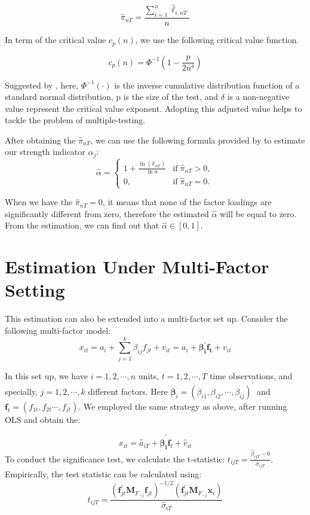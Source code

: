 \[  \hat{\pi}_{nT} = \frac{\sum_{i=1}^n \hat{\ell}_{i,nT}}{n} \tag{4} \label{pi_function} \]


In term of the critical value $c_p(n)$, we use the following critical value function.

\[   c_p(n) = \Phi^{-1}(1 - \frac{p}{2n^\delta})   \tag{5} \label{critical_value_function} \]

Suggested by , here, $\Phi^{-1}(\cdot)$ is the inverse cumulative distribution function of a standard normal distribution, p is the size of the test, and $\delta$ is a non-negative value represent the critical value exponent. 
Adopting this adjusted value helps to tackle the problem of multiple-testing.


After obtaining the $\hat{\pi}_{nT}$, we can use the following formula provided by  to estimate our strength indicator $\alpha_j$:
\[ \hat{\alpha} = \begin{cases}
1+\frac{\ln(\hat{\pi}_{nT})}{\ln n} & \text{if}\; \hat{\pi}_{nT} > 0,\\
0, & \text{if}\; \hat{\pi}_{nT} = 0.
	\end{cases} \tag{6} \label{estimation_method} \]

When we have the $\hat{\pi}_{nT} = 0$, it means that none of the factor loadings are significantly different from zero, therefore the estimated $\hat{\alpha}$ will be equal to zero. 
From the estimation, we can find out that $\hat{\alpha} \in [0,1]$.

\section{Estimation Under Multi-Factor Setting}\label{strength_multi_estimation}

This estimation can also be extended into a multi-factor set up.
Consider the following multi-factor model:
\[x_{it} = a_i +\sum_{j = 1}^k\beta_{ij}f_{jt} +v_{it} = a_i + \bm{\beta^{\prime}_{i}f_{t}} +v_{it} \tag{7} \label{multi_factor_model} \]

In this set up, we have $i = 1, 2, \cdots, n$ units, $t = 1, 2, \cdots, T$ time observations, and specially, $j = 1, 2,\cdots, k$ different factors.
Here $\bm{\beta}_{i} = (\beta_{i1}, \beta_{i2}, \cdots, \beta_{ij})^{\prime} $ and $\bm{f}_t = (f_{1t}, f_{2t}\cdots, f_{jt})$.
We employed the same strategy as above, after running OLS and obtain the:

\[ x_{it} =\hat{a}_{iT} + \bm{\hat{\beta}^{\prime}_{i}}\bm{f}_{t} + \hat{v}_{it}    \]
To conduct the significance test, we calculate the t-statistic: $t_{ijT} = \frac{\hat{\beta}_{ijT}-0}{\hat{\sigma}_{ijT}}$. Empirically, the test statistic can be calculated using:
\[ t_{i j T}=\frac{\left(\bm{f}_{j t}^{\prime} \bm{M}_{F_{-j}} \bm{f}_{j t}\right)^{-1 / 2}\left(\bm{f}_{j t}^{\prime} \bm{M}_{F_{-j}} \bm{x}_{i}\right)}{\hat{\sigma}_{i T}} \]

